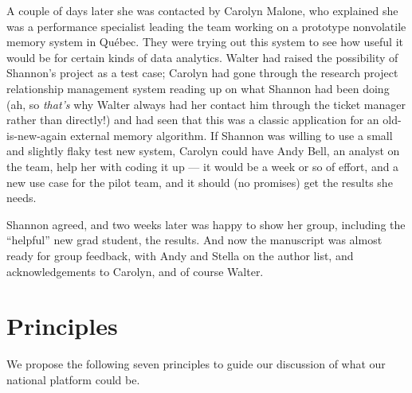 \documentclass[11pt, letterpaper, twoside]{article}
\begin{document}
\begin{tcolorbox}[enhanced,breakable,colback=gray!15,colframe=cdaRed,parbox=false]
A couple of days later she was contacted by Carolyn Malone, who
explained she was a performance specialist leading the team working on a
prototype nonvolatile memory system in Qu\'ebec. They were trying out
this system to see how useful it would be for certain kinds of data
analytics. Walter had raised the possibility of Shannon's project as a
test case; Carolyn had gone through the research project relationship
management system reading up on what Shannon had been doing (ah, so
\textit{that's} why Walter always had her contact him through the ticket
manager rather than directly!) and had seen that this was a classic
application for an old-is-new-again external memory algorithm. If
Shannon was willing to use a small and slightly flaky test new system,
Carolyn could have Andy Bell, an analyst on the team, help her with
coding it up --- it would be a week or so of effort, and a new use case
for the pilot team, and it should (no promises) get the results she
needs.

Shannon agreed, and two weeks later was happy to show her group,
including the ``helpful'' new grad student, the results. And now the
manuscript was almost ready for group feedback, with Andy and Stella on
the author list, and acknowledgements to Carolyn, and of course Walter.
\end{tcolorbox}

\section*{Principles}
%
%

We propose the following seven principles to guide our discussion 
of what our national platform could be.
\end{document}
